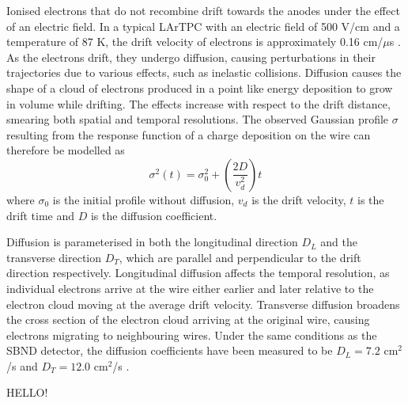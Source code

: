 Ionised electrons that do not recombine drift towards the anodes under the effect of an electric field.
In a typical LArTPC with an electric field of 500 V/cm and a temperature of 87 K, the drift velocity of electrons is approximately 0.16 cm/$\mu$s \cite{drift_vel}.
As the electrons drift, they undergo diffusion, causing perturbations in their trajectories due to various effects, such as inelastic collisions.
Diffusion causes the shape of a cloud of electrons produced in a point like energy deposition to grow in volume while drifting.
The effects increase with respect to the drift distance, smearing both spatial and temporal resolutions.
The observed Gaussian profile $\sigma$ resulting from the response function of a charge deposition on the wire can therefore be modelled as \cite{uboone_diff} 
\begin{equation}
	\sigma^{2} (t) = \sigma^{2}_{0} + \left(\frac{2D}{v^{2}_{d}}\right)t
\end{equation}
where $\sigma_{0}$ is the initial profile without diffusion, $v_{d}$ is the drift velocity, $t$ is the drift time and $D$ is the diffusion coefficient.

Diffusion is parameterised in both the longitudinal direction $D_{L}$ and the transverse direction $D_{T}$, which are parallel and perpendicular to the drift direction respectively.
Longitudinal diffusion affects the temporal resolution, as individual electrons arrive at the wire either earlier and later relative to the electron cloud moving at the average drift velocity.
Transverse diffusion broadens the cross section of the electron cloud arriving at the original wire, causing electrons migrating to neighbouring wires.
Under the same conditions as the SBND detector, the diffusion coefficients have been measured to be $D_{L} = 7.2 $ cm$^{2}$/s and $D_T = 12.0 $ cm$^{2}$/s \cite{drift_vel}.

HELLO! 
\cite{GrayDiffusion}


